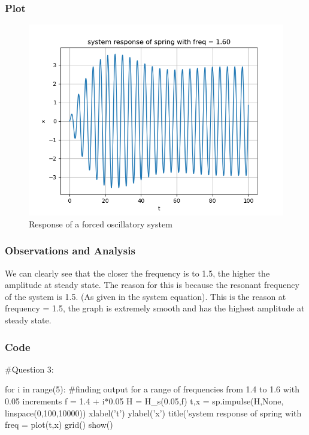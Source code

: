 \documentclass[11pt]{article}
\begin{document}
\subsubsection{Plot}
\begin{figure}[H]
    \centering
    \includegraphics[scale = 1]{Figure_7.png}
    \caption{Response of a forced oscillatory system}
\end{figure}

\subsubsection{Observations and Analysis}
We can clearly see that the closer the frequency is to 1.5, the higher the amplitude at steady state. The reason for this is because the resonant frequency of the system is 1.5. (As given in the system equation).
This is the reason at frequency = 1.5, the graph is extremely smooth and has the highest amplitude at steady state.

\subsubsection{Code}
\begin{python}
#Question 3:

for i in range(5): #finding output for a range of frequencies from 1.4 to 1.6 with 0.05 increments
	f = 1.4 + i*0.05
	H = H_s(0.05,f)
	t,x = sp.impulse(H,None, linspace(0,100,10000))
	xlabel('t')
	ylabel('x')
	title('system response of spring with freq = %
	plot(t,x)
	grid()
	show()
\end{python}
\end{document}
